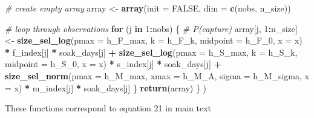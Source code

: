 \documentclass[
]{article}
\newenvironment{Shaded}{\begin{snugshade}}{\end{snugshade}}
\newcommand{\AttributeTok}[1]{\textcolor[rgb]{0.13,0.29,0.53}{#1}}
\newcommand{\CommentTok}[1]{\textcolor[rgb]{0.56,0.35,0.01}{\textit{#1}}}
\newcommand{\ConstantTok}[1]{\textcolor[rgb]{0.56,0.35,0.01}{#1}}
\newcommand{\ControlFlowTok}[1]{\textcolor[rgb]{0.13,0.29,0.53}{\textbf{#1}}}
\newcommand{\DecValTok}[1]{\textcolor[rgb]{0.00,0.00,0.81}{#1}}
\newcommand{\FunctionTok}[1]{\textcolor[rgb]{0.13,0.29,0.53}{\textbf{#1}}}
\newcommand{\NormalTok}[1]{#1}
\newcommand{\OtherTok}[1]{\textcolor[rgb]{0.56,0.35,0.01}{#1}}
\newcommand{\SpecialCharTok}[1]{\textcolor[rgb]{0.81,0.36,0.00}{\textbf{#1}}}
\begin{document}
\begin{Shaded}
\begin{Highlighting}[]
    \CommentTok{\# create empty array}
\NormalTok{    array }\OtherTok{\textless{}{-}} \FunctionTok{array}\NormalTok{(}\AttributeTok{init =} \ConstantTok{FALSE}\NormalTok{, }\AttributeTok{dim =} \FunctionTok{c}\NormalTok{(nobs, n\_size))}
    
    \CommentTok{\# loop through observations}
    \ControlFlowTok{for}\NormalTok{ (j }\ControlFlowTok{in} \DecValTok{1}\SpecialCharTok{:}\NormalTok{nobs) \{}
      \CommentTok{\# P(capture)}
\NormalTok{      array[j, }\DecValTok{1}\SpecialCharTok{:}\NormalTok{n\_size] }\OtherTok{\textless{}{-}} \FunctionTok{size\_sel\_log}\NormalTok{(}\AttributeTok{pmax =}\NormalTok{ h\_F\_max, }\AttributeTok{k =}\NormalTok{ h\_F\_k,}
                                         \AttributeTok{midpoint =}\NormalTok{ h\_F\_0, }\AttributeTok{x =}\NormalTok{ x) }\SpecialCharTok{*}
\NormalTok{        f\_index[j] }\SpecialCharTok{*}\NormalTok{ soak\_days[j] }\SpecialCharTok{+}
        \FunctionTok{size\_sel\_log}\NormalTok{(}\AttributeTok{pmax =}\NormalTok{ h\_S\_max, }\AttributeTok{k =}\NormalTok{ h\_S\_k, }\AttributeTok{midpoint =}\NormalTok{ h\_S\_0, }\AttributeTok{x =}\NormalTok{ x) }\SpecialCharTok{*}
\NormalTok{        s\_index[j] }\SpecialCharTok{*}\NormalTok{ soak\_days[j] }\SpecialCharTok{+}
        \FunctionTok{size\_sel\_norm}\NormalTok{(}\AttributeTok{pmax =}\NormalTok{ h\_M\_max, }\AttributeTok{xmax =}\NormalTok{ h\_M\_A, }\AttributeTok{sigma =}\NormalTok{ h\_M\_sigma, }\AttributeTok{x =}\NormalTok{ x) }\SpecialCharTok{*}
\NormalTok{        m\_index[j] }\SpecialCharTok{*}\NormalTok{ soak\_days[j]}
\NormalTok{    \}}
      \FunctionTok{return}\NormalTok{(array)}
\NormalTok{  \}}
\NormalTok{)}
\end{Highlighting}
\end{Shaded}

These functions correspond to equation 21 in main text
\end{document}
